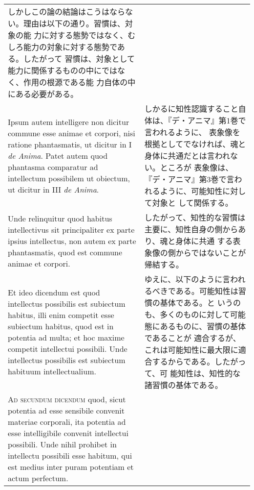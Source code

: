 \documentclass[10pt]{jsarticle} %
\begin{document}
\begin{longtable}{p{21em}p{21em}}
しかしこの論の結論はこうはならない。理由は以下の通り。習慣は、対象の能
力に対する態勢ではなく、むしろ能力の対象に対する態勢である。したがって
習慣は、対象として能力に関係するものの中にではなく、作用の根源である能
力自体の中にある必要がある。

\\


Ipsum autem intelligere non dicitur commune esse animae et corpori,
nisi ratione phantasmatis, ut dicitur in I {\itshape de Anima}. Patet autem quod
phantasma comparatur ad intellectum possibilem ut obiectum, ut dicitur
in III {\itshape de Anima}.

&

しかるに知性認識すること自体は、『デ・アニマ』第1巻で言われるように、
表象像を根拠としてでなければ、魂と身体に共通だとは言われない。ところが
表象像は、『デ・アニマ』第3巻で言われるように、可能知性に対して対象と
して関係する。

\\

Unde relinquitur quod habitus intellectivus sit principaliter ex parte
ipsius intellectus, non autem ex parte phantasmatis, quod est commune
animae et corpori.

&

したがって、知性的な習慣は主要に、知性自身の側からあり、魂と身体に共通
する表象像の側からではないことが帰結する。

\\

Et ideo dicendum est quod intellectus possibilis est subiectum
habitus, illi enim competit esse subiectum habitus, quod est in
potentia ad multa; et hoc maxime competit intellectui possibili. Unde
intellectus possibilis est subiectum habituum intellectualium.

&

ゆえに、以下のように言われるべきである。可能知性は習慣の基体である。と
いうのも、多くのものに対して可能態にあるものに、習慣の基体であることが
適合するが、これは可能知性に最大限に適合するからである。したがって、可
能知性は、知性的な諸習慣の基体である。

\\


{\scshape Ad secundum dicendum} quod, sicut potentia ad esse sensibile
convenit materiae corporali, ita potentia ad esse intelligibile
convenit intellectui possibili. Unde nihil prohibet in intellectu
possibili esse habitum, qui est medius inter puram potentiam et actum
perfectum.

&


\end{longtable}
\end{document}
